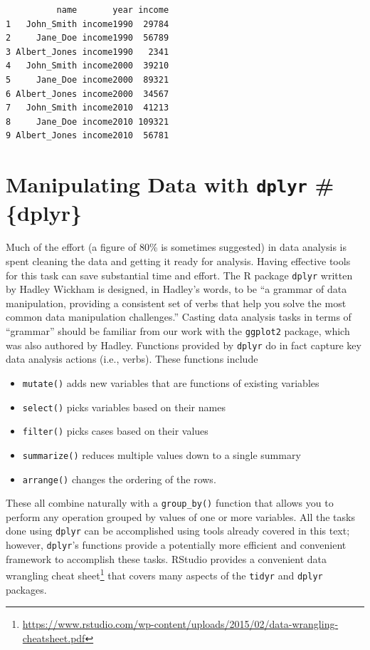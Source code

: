 \documentclass[]{krantz}
\providecommand{\tightlist}{%
  \setlength{\itemsep}{0pt}\setlength{\parskip}{0pt}}
\renewcommand{\href}[2]{#2\footnote{\url{#1}}}
\begin{document}
\begin{verbatim}
          name       year income
1   John_Smith income1990  29784
2     Jane_Doe income1990  56789
3 Albert_Jones income1990   2341
4   John_Smith income2000  39210
5     Jane_Doe income2000  89321
6 Albert_Jones income2000  34567
7   John_Smith income2010  41213
8     Jane_Doe income2010 109321
9 Albert_Jones income2010  56781
\end{verbatim}

\hypertarget{manipulating-data-with-dplyr-dplyr}{%
\section{\texorpdfstring{Manipulating Data with \texttt{dplyr} \#\{dplyr\}}{Manipulating Data with dplyr \#\{dplyr\}}}\label{manipulating-data-with-dplyr-dplyr}}

Much of the effort (a figure of 80\% is sometimes suggested) in data analysis is spent cleaning the data and getting it ready for analysis. Having effective tools for this task can save substantial time and effort. The R package \texttt{dplyr} written by Hadley Wickham is designed, in Hadley's words, to be ``a grammar of data manipulation, providing a consistent set of verbs that help you solve the most common data manipulation challenges.'' Casting data analysis tasks in terms of ``grammar'' should be familiar from our work with the \texttt{ggplot2} package, which was also authored by Hadley. Functions provided by \texttt{dplyr} do in fact capture key data analysis actions (i.e., verbs). These functions include

\begin{itemize}
\tightlist
\item
  \texttt{mutate()} adds new variables that are functions of existing variables
\item
  \texttt{select()} picks variables based on their names
\item
  \texttt{filter()} picks cases based on their values
\item
  \texttt{summarize()} reduces multiple values down to a single summary
\item
  \texttt{arrange()} changes the ordering of the rows.
\end{itemize}

These all combine naturally with a \texttt{group\_by()} function that allows you to perform any operation grouped by values of one or more variables. All the tasks done using \texttt{dplyr} can be accomplished using tools already covered in this text; however, \texttt{dplyr}'s functions provide a potentially more efficient and convenient framework to accomplish these tasks. RStudio provides a convenient \href{https://www.rstudio.com/wp-content/uploads/2015/02/data-wrangling-cheatsheet.pdf}{data wrangling cheat sheet} that covers many aspects of the \texttt{tidyr} and \texttt{dplyr} packages.
\end{document}
